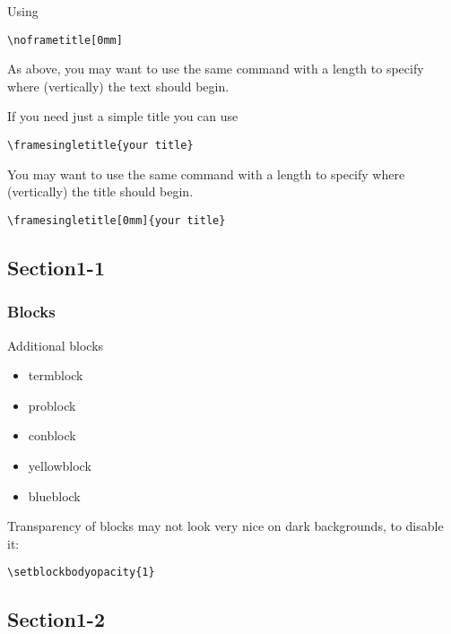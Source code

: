 \documentclass[t,compress,aspectratio=169]{beamer}
\begin{document}
\begin{frame}[fragile]
\noframetitle[0mm]
Using 
\begin{lstlisting}
\noframetitle[0mm]
\end{lstlisting}

\vskip 5mm
As above, you may want to use the same command with a length to specify where (vertically) the text should begin.
\end{frame}

\begin{frame}[fragile]
If you need just a simple title you can use
\begin{lstlisting}
\framesingletitle{your title}
\end{lstlisting}

\vskip 5mm
You may want to use the same command with a length to specify where (vertically) the title should begin.
\begin{lstlisting}
\framesingletitle[0mm]{your title}
\end{lstlisting}
\end{frame}

\subsection{Section1-1}
\begin{frame}[fragile]
\frametitle{Blocks}
Additional blocks
\begin{itemize}
  \item termblock
  \item problock
  \item conblock
  \item yellowblock
  \item blueblock
\end{itemize}
Transparency of blocks may not look very nice on dark backgrounds, to disable it:
\begin{lstlisting}
\setblockbodyopacity{1}
\end{lstlisting}
\end{frame}

\subsection{Section1-2}
\end{document}
